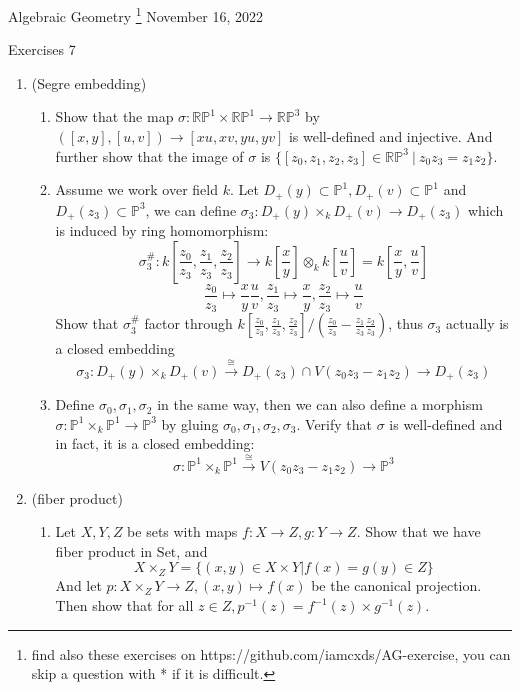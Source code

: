 \documentclass[a4paper,11pt]{article}
\def\bb#1{\mathbb{#1}}
\begin{document}
{\small Algebraic Geometry
\footnote{find also these exercises on https://github.com/iamcxds/AG-exercise, you can skip a question with * if it is difficult.}
 \hfill November 16, 2022 \\}
\begin{center}
\Huge Exercises 7
\end{center}

\vskip0.6cm


\begin{enumerate}[1.]
\item(Segre embedding) 
\begin{enumerate}
    \item Show that the map $\sigma:\bb{RP}^1\times\bb{RP}^1\to \bb{RP}^3$ by $([x,y],[u,v])\to[xu,xv,yu,yv]$ is well-defined and injective. And further show that the image of $\sigma$ is $\{[z_0,z_1,z_2,z_3]\in\bb{RP}^3\ |\  z_0z_3=z_1z_2\}$.
    \item Assume we work over field $k$.
    Let $D_+(y)\subset\bb{P}^1, D_+(v)\subset\bb{P}^1$ and $D_+(z_3)\subset\bb{P}^3$, we can define $\sigma_3: D_+(y)\times_k D_+(v) \to D_+(z_3)$ which is induced by ring homomorphism:
    \[ \sigma_3^\#: k[\frac{z_0}{z_3},\frac{z_1}{z_3},\frac{z_2}{z_3}] \to k[\frac{x}{y}]\otimes_k k[\frac{u}{v}]=k[\frac{x}{y},\frac{u}{v}]\]
    \[ \frac{z_0}{z_3}\mapsto \frac{x}{y}\frac{u}{v}, 
     \frac{z_1}{z_3}\mapsto \frac{x}{y}, 
     \frac{z_2}{z_3}\mapsto \frac{u}{v} \]
    Show that $\sigma_3^\#$ factor through 
    $k[\frac{z_0}{z_3},\frac{z_1}{z_3},\frac{z_2}{z_3}]/(\frac{z_0}{z_3}-\frac{z_1}{z_3}\frac{z_2}{z_3})$, 
    thus $\sigma_3$ actually is a closed embedding 
    \[\sigma_3: D_+(y)\times_k D_+(v)\xrightarrow{\cong} D_+(z_3)\cap V(z_0z_3-z_1z_2) \to D_+(z_3)\]
    \item Define $\sigma_0,\sigma_1,\sigma_2$ in the same way,
    then we can also define a morphism $\sigma:\bb{P}^1\times_k \bb{P}^1\to \bb{P}^3$ by gluing  $\sigma_0,\sigma_1,\sigma_2,\sigma_3$. Verify that $\sigma$ is well-defined and in fact, it is a closed embedding:
    \[\sigma:\bb{P}^1\times_k \bb{P}^1\xrightarrow{\cong}V(z_0z_3-z_1z_2)\to \bb{P}^3\]
\end{enumerate}
\item (fiber product)
\begin{enumerate}
    \item Let $X,Y,Z$ be sets with maps $f:X\to Z,g:Y\to Z$. Show that we have fiber product in $\mathrm{Set}$, and
    \[X \times_Z Y=\{(x,y)\in X \times Y | f(x)=g(y)\in Z \}\]
    And let $p:X \times_Z Y\to Z, (x,y)\mapsto f(x)$ be the canonical projection. Then show that for all $z\in Z, p^{-1}(z)=f^{-1}(z)\times g^{-1}(z)$. 

\end{enumerate}
\end{enumerate}
\end{document}
